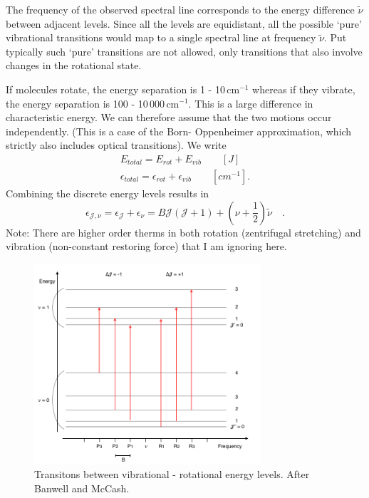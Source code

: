 The frequency of the observed spectral line corresponds to the energy
difference $\tilde{\nu}$ between adjacent levels. Since all the levels
are equidistant, all the possible `pure' vibrational transitions would
map to a single spectral line at frequency $\tilde{\nu}$. Put
typically such `pure' transitions are not allowed, only transitions
that also involve changes in the rotational state.

If molecules rotate, the energy separation is 1 - 10\,cm$^{-1}$
whereas if they vibrate, the energy separation is 100 -
10\,000\,cm$^{-1}$. This is a large difference in characteristic
energy. We can therefore assume that the two motions occur
independently.  (This is a case of the Born- Oppenheimer
approximation, which strictly also includes optical transitions). We
write
 \begin{gather}
E_{total} = E_{rot} + E_{vib} \qquad \left[J\right]  \\
\epsilon_{total} = \epsilon_{rot} + \epsilon_{vib} \qquad \left[cm^{-1}\right].
 \end{gather}
Combining the discrete energy levels results in
\begin{equation}
\epsilon_{\mathcal{J},\nu} = \epsilon_{\mathcal{J}} + \epsilon_{\nu} =
B \mathcal{J} (\mathcal{J} + 1) + (\nu + \frac{1}{2})\tilde{\nu} \quad .
\end{equation}
Note: There are higher order therms in both rotation (zentrifugal stretching) and vibration (non-constant restoring force) that I am ignoring here. \par
 
 \begin{figure}
\begin{center}
\includegraphics[width=0.75\textwidth]{figures/Transitions_vib_rot}
\caption{Transitons between vibrational - rotational energy levels. After Banwell and McCash.}
\label{Transitions_vib_rot}
\end{center}
\end{figure}
 
